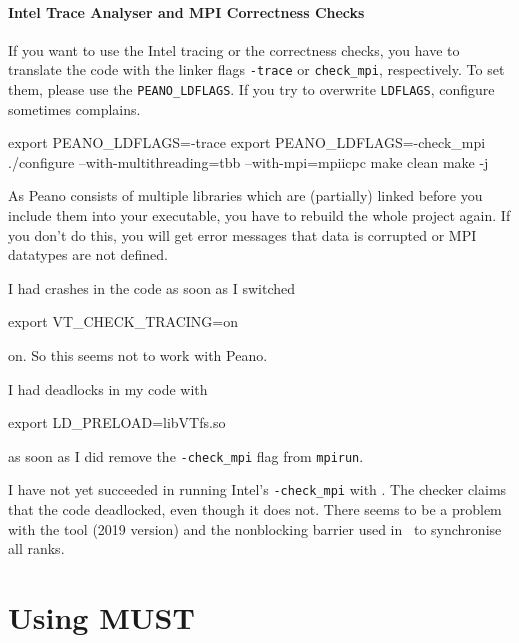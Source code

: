 \paragraph{Intel Trace Analyser and MPI Correctness Checks}

If you want to use the Intel tracing or the correctness checks, you have to
translate the code with the linker flags \texttt{-trace} or \texttt{check\_mpi},
respectively.
To set them, please use the \texttt{PEANO\_LDFLAGS}.
If you try to overwrite \texttt{LDFLAGS}, configure sometimes complains.


\begin{code}
 export PEANO_LDFLAGS=-trace
 export PEANO_LDFLAGS=-check_mpi
 ./configure --with-multithreading=tbb --with-mpi=mpiicpc
 make clean
 make -j
\end{code}


\noindent
As Peano consists of multiple libraries which are (partially) linked before you
include them into your executable, you have to rebuild the whole project again.
If you don't do this, you will get error messages that data is corrupted or MPI
datatypes are not defined.



\begin{remark}
 I had crashes in the code as soon as I switched
 \begin{code}
 export VT_CHECK_TRACING=on
 \end{code}
 on. So this seems not to work with Peano.
\end{remark}



\begin{remark}
 I had deadlocks in my code with
 \begin{code}
 export LD_PRELOAD=libVTfs.so
 \end{code}
 as soon as I did remove the \texttt{-check\_mpi} flag from \texttt{mpirun}.
\end{remark}



\begin{remark}
 I have not yet succeeded in running Intel's \texttt{-check\_mpi} with \ExaHyPE.
 The checker claims that the code deadlocked, even though it does not. There
 seems to be a problem with the tool (2019 version) and the nonblocking barrier
 used in \ExaHyPE\ to synchronise all ranks.
\end{remark}


\section{Using MUST}
\label{section:supercomputers:MUST}

